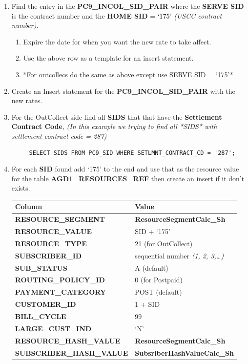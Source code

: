 \documentclass[12pt,twoside]{article}
\begin{document}
\begin{enumerate}
\item Find the entry in the \textbf{PC9\_INCOL\_SID\_PAIR} where the \textbf{SERVE SID} is the contract number and the \textbf{HOME SID} = `175' \emph{(USCC contract number)}.
\begin{enumerate}
\item Expire the date for when you want the new rate to take affect.
\item Use the above row as a template for an insert statement.
\item *For outcollecs do the same as above except use SERVE SID = `175'*
\end{enumerate}
\item Create an Insert statement for the  \textbf{PC9\_INCOL\_SID\_PAIR} with the new rates.
\item For the OutCollect side find all \textbf{SIDS} that that have the \textbf{Settlement Contract Code}, \emph{(In this example we trying to find all *SIDS* with settlement contract code = 287)}
\begin{verbatim}
     SELECT SIDS FROM PC9_SID WHERE SETLMNT_CONTRACT_CD = '287';
\end{verbatim}
\item For each \textbf{SID} found add `175' to the end and use that as the resource value for the table \textbf{AGD1\_RESOURCES\_REF} then create an insert if it don't exists.
   \footnotesize

\begin{center}
\begin{tabular}{ll}
\hline
 \textbf{Column}                   &  \textbf{Value}                        \\
\hline
 \textbf{RESOURCE\_SEGMENT}        &  \textbf{ResourceSegmentCalc\_Sh}      \\
 \textbf{RESOURCE\_VALUE}          &  SID + `175'                           \\
 \textbf{RESOURCE\_TYPE}           &  21 (for OutCollect)                   \\
 \textbf{SUBSCRIBER\_ID}           &  sequential number \emph{(1, 2, 3,…)}  \\
 \textbf{SUB\_STATUS}              &  A (default)                           \\
 \textbf{ROUTING\_POLICY\_ID}      &  0 (for Postpaid)                      \\
 \textbf{PAYMENT\_CATEGORY}        &  POST (default)                        \\
 \textbf{CUSTOMER\_ID}             &  1 + SID                               \\
 \textbf{BILL\_CYCLE}              &  99                                    \\
 \textbf{LARGE\_CUST\_IND}         &  ‘N’                                   \\
 \textbf{RESOURCE\_HASH\_VALUE}    &  \textbf{ResourceSegmentCalc\_Sh}      \\
 \textbf{SUBSCRIBER\_HASH\_VALUE}  &  \textbf{SubsriberHashValueCalc\_Sh}   \\
\hline
\end{tabular}
\end{center}



\end{enumerate}
\end{document}
